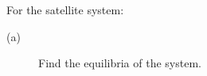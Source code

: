 For the satellite system:
    \begin{description}
    \item[(a)] Find the equilibria of the system.
    \end{description}